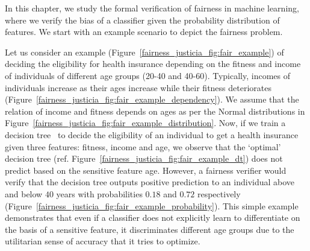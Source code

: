 \label{chapter:justicia}
In this chapter, we study the formal verification of fairness in machine learning, where we verify the bias of a classifier given the probability distribution of features. We start with an example scenario to depict the fairness problem.



\begin{example}\label{fairness_justicia_example:intro}
\normalfont
Let us consider an example (Figure~\ref{fairness_justicia_fig:fair_example}) of deciding the eligibility for health insurance depending on the fitness and income of individuals of different age groups (20-40 and 40-60). Typically, incomes of individuals increase as their ages increase while their fitness deteriorates (Figure~\ref{fairness_justicia_fig:fair_example_dependency}). We assume that the relation of income and fitness depends on ages as per the Normal distributions in Figure~\ref{fairness_justicia_fig:fair_example_distribution}. Now, if we train a decision tree~\cite{narodytska2018learning} to decide the eligibility of an individual to get a health insurance given three features: fitness, income and age, we observe that the `optimal' decision tree (ref. Figure~\ref{fairness_justicia_fig:fair_example_dt}) does not predict based on the sensitive feature age. However, a fairness verifier would verify that the decision tree outputs positive prediction to an individual above and below $40$ years with probabilities $0.18$ and $0.72$ respectively (Figure~\ref{fairness_justicia_fig:fair_example_probability}). This simple example demonstrates that even if a classifier does not explicitly learn to differentiate on the basis of a sensitive feature, it discriminates different age groups due to the utilitarian sense of accuracy that it tries to optimize.
\end{example}


